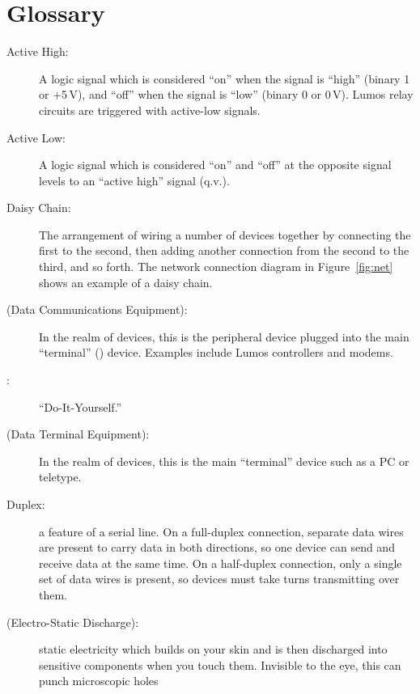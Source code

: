 \documentclass[letterpaper,twoside,onecolumn,openright,final]{memoir}
\begin{document}
\chapter{Glossary}\label{ch:glossary}
\begin{description}
	\item[Active High:]
		A logic signal which is considered ``on'' when the signal is ``high'' (binary 1 or +5\,V),
		and ``off'' when the signal is ``low'' (binary 0 or 0\,V).  Lumos relay circuits are 
		triggered with active-low signals.
	\item[Active Low:]
		A logic signal which is considered ``on'' and ``off'' at the opposite signal levels
		to an ``active high'' signal (q.v.).
	\item[Daisy Chain:]
		The arrangement of wiring a number of devices together by connecting the first to the second,
		then adding another connection from the second to the third, and so forth.  The network
		connection diagram in Figure~\ref{fig:net} shows an example of a daisy chain.
	\item[ (Data Communications Equipment):]  In the realm of  devices, this is the peripheral
		device plugged into the main ``terminal'' () device.  Examples include
		Lumos controllers and modems.
	\item[:] ``Do-It-Yourself.''
	\item[ (Data Terminal Equipment):]  In the realm of  devices, this is the
		main ``terminal'' device such as a PC or teletype.
	\item[Duplex:]
		a feature of a serial line.  On a full-duplex connection, separate data wires are present
		to carry data in both directions, so one device can send and receive data at the same time.
		On a half-duplex connection, only a single set of data wires is present, so devices must
		take turns transmitting over them.
	\item[ (Electro-Static Discharge):]
		static electricity which builds on your skin and is then discharged into sensitive
		components when you touch them.  Invisible to the eye, this can punch microscopic holes

\end{description}
\end{document}
